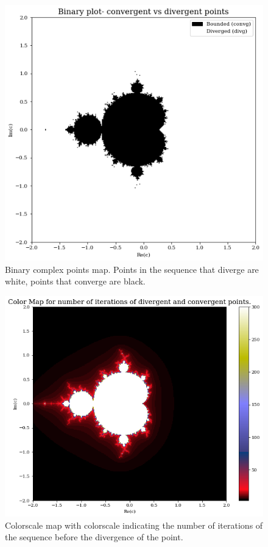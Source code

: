 \documentclass{article}
\begin{document}
\begin{figure}[htbp]
\centerline{\includegraphics[scale=.4]{A3_q1_binary.png}}
\caption{Binary complex points map. Points in the sequence that diverge are white, points that converge are black.}
\label{fig}
\end{figure}

\begin{figure}[htbp]
\centerline{\includegraphics[scale=.4]{A3_q1_iter.png}}
\caption{Colorscale map with colorscale indicating the number of iterations of the sequence before the divergence of the point.}
\label{fig}
\end{figure}
\end{document}
